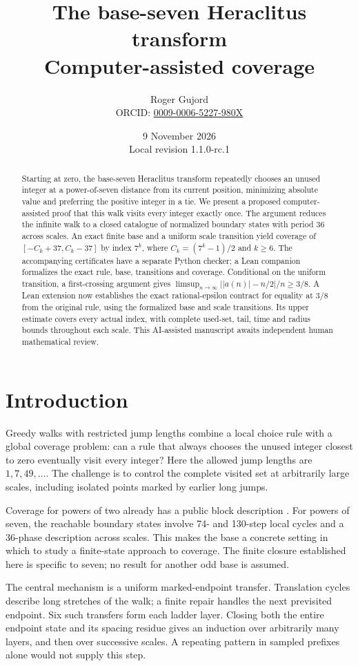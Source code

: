 \documentclass[11pt,a4paper]{article}
\title{The base-seven Heraclitus transform\\[5pt]\large Computer-assisted coverage}
\author{Roger Gujord\\\small ORCID: \href{https://orcid.org/0009-0006-5227-980X}{0009-0006-5227-980X}}
\date{9 November 2026\\\small Local revision 1.1.0-rc.1}
\begin{document}
\maketitle
\begin{abstract}
Starting at zero, the base-seven Heraclitus transform repeatedly chooses an
unused integer at a power-of-seven distance from its current position,
minimizing absolute value and preferring the positive integer in a tie.
We present a proposed computer-assisted proof that this walk visits every
integer exactly once. The argument reduces the infinite walk to a closed
catalogue of normalized boundary states with period 36 across scales.
An exact finite base and a uniform scale transition yield coverage of
$[-C_k+37,C_k-37]$ by index $7^k$, where $C_k=(7^k-1)/2$ and $k\ge6$.
The accompanying certificates have a separate Python checker; a Lean
companion formalizes the exact rule, base, transitions and coverage.
Conditional on the uniform transition, a first-crossing argument gives
$\limsup_{n\to\infty}\bigl||a(n)|-n/2\bigr|/n\ge3/8$.
A Lean extension now establishes the exact rational-epsilon contract for
equality at $3/8$ from the original rule, using the formalized base and
scale transitions. Its upper estimate covers every actual index, with
complete used-set, tail, time and radius bounds throughout each scale.
This AI-assisted manuscript awaits independent human mathematical review.
\end{abstract}

\section*{Introduction}
Greedy walks with restricted jump lengths combine a local choice rule with
a global coverage problem: can a rule that always chooses the unused
integer closest to zero eventually visit every integer? Here the allowed
jump lengths are $1,7,49,\ldots$. The challenge is to control the complete
visited set at arbitrarily large scales, including isolated points marked
by earlier long jumps.

Coverage for powers of two already has a public block description \cite{ref1}.
For powers of seven, the reachable boundary states involve 74- and 130-step
local cycles and a 36-phase description across scales. This makes the base
a concrete setting in which to study a finite-state approach to coverage.
The finite closure established here is specific to seven; no result for
another odd base is assumed.

The central mechanism is a uniform marked-endpoint transfer. Translation
cycles describe long stretches of the walk; a finite repair handles the
next previsited endpoint. Six such transfers form each ladder layer.
Closing both the entire endpoint state and its spacing residue gives an
induction over arbitrarily many layers, and then over successive scales.
A repeating pattern in sampled prefixes alone would not supply this step.
\end{document}
